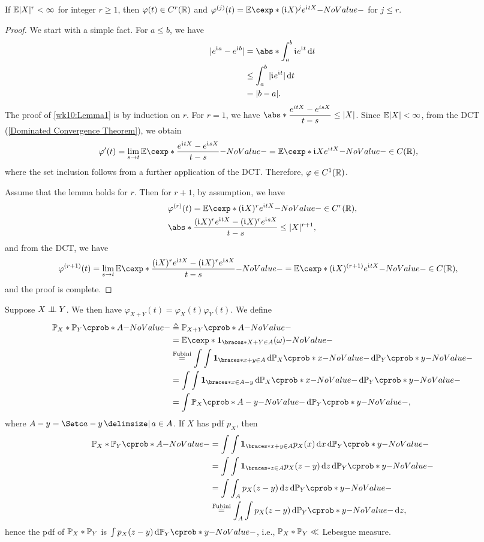 \documentclass[12pt]{article}
\begin{document}
\begin{Lemma}\label{wk10:Lemma1}
If $\E|X|^r< \infty$ for integer $r\geq1$, then $\varphi(t)\in C^r(\mathbb{R})$ and $\varphi\tc{j}(t)=\E [(\iu X)^j e^{\iu tX}]$ for $j\leq r$.
\end{Lemma}
\begin{proof}
We start with a simple fact. For $a\leq b$, we have
\begin{align*}
|e^{\iu a}-e^{\iu b}| 	
& = \abs*{\int _a^b \iu e^{\iu t} \ud t}\\
& \leq \int _a^b |\iu e^{\iu t}| \ud t\\
& = |b-a|.
\end{align*}
The proof of \cref{wk10:Lemma1} is by induction on $r$. For $r=1$, we have $\abs*{\dfrac{e^{itX}-e^{isX}}{t-s}}\leq |X|$. Since $\E |X| < \infty$, from the DCT (\cref{Dominated Convergence Theorem}), we obtain 
\begin{align*}
\varphi'(t)	& =\lim_{s\to t}\E[\frac{e^{\iu tX}-e^{\iu sX}}{t-s}] = \E[\iu Xe^{\iu tX}]\in C(\Real),
\end{align*}
where the set inclusion follows from a further application of the DCT. Therefore, $\varphi \in C^1(\mathbb{R})$.

Assume that the lemma holds for $r$. Then for $r+1$, by assumption, we have
\begin{align*}
&\varphi\tc{r}(t) = \E [(\iu X)^r e^{\iu tX}]\in C^r(\Real),\\
&\abs*{\frac{(\iu X)^r e^{\iu tX}-(\iu X)^r e^{\iu sX}}{t-s}} \leq |X|^{r+1},
\end{align*}
and from the DCT, we have
\begin{align*}
\varphi\tc{r+1}(t)	& =\lim_{s\to t}\E[\frac{(\iu X)^r e^{\iu tX}-(\iu X)^r e^{\iu sX}}{t-s}] = \E[(\iu X)^{(r+1)}e^{\iu tX}]\in C(\Real),
\end{align*}
and the proof is complete.
\end{proof}

Suppose $X\independent Y$. We then have $\varphi_{X+Y}(t)=\varphi_X(t)\varphi_Y(t)$. We define 
\begin{align*}
\P_X *\P_Y(A)	& \triangleq \P_{X+Y}(A) \\
& = \E[\indicator{X+Y\in A} (\omega)]\\
& \eqa{\text{Fubini}} \int \int \indicator{x+y\in A} \ud \P_X(x) \ud \P_Y(y)\\
& = \int \int \indicator{x\in A-y} \ud \P_X(x) \ud \P_Y(y)\\
& = \int \P_X(A-y)\ud \P_Y(y),
\end{align*}
where $A-y = \set{a-y \given a\in A}$. If $X$ has pdf $p_X$, then
\begin{align*}
\P_X *\P_Y(A)	
& = \int \int \indicator{x+y\in A} p_X(x) \ud x \ud \P_Y(y) \\
& = \int\int \indicator{z\in A} p_X(z-y) \ud z \ud \P_Y(y) \\
& = \int\int_A p_X(z-y) \ud z \ud \P_Y(y) \\
& \eqa{\text{Fubini}} \int_A\int p_X(z-y) \ud \P_Y(y) \ud z,
\end{align*}
hence the pdf of $\P_X *\P_Y$ is $\int p_X(z-y) \ud \P_Y(y)$, i.e., $\P_X *\P_Y \ll$ Lebesgue measure.
\end{document}
